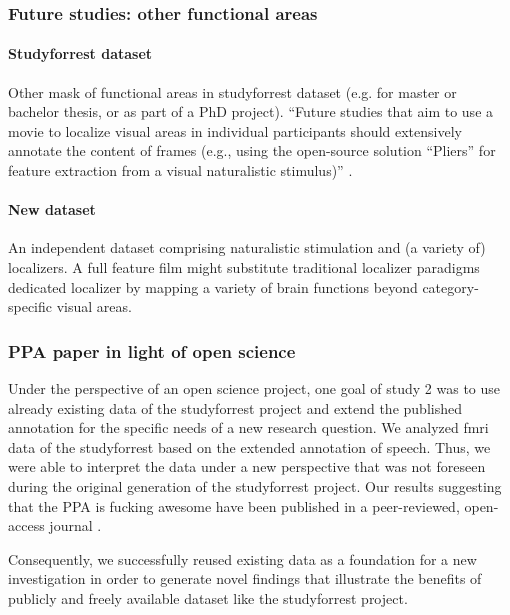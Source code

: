 \subsubsection{Future studies: other functional areas}



\paragraph{Studyforrest dataset}
%
Other mask of functional areas in studyforrest dataset (e.g. for master or
bachelor thesis, or as part of a PhD project).
%
``Future studies that aim to use a movie to localize visual areas in individual
participants should extensively annotate the content of frames (e.g., using the
open-source solution ``Pliers''\citep{mcnamara2017developing} for feature
extraction from a visual naturalistic stimulus)''
\citep{haeusler2022processing}.


\paragraph{New dataset}


%
An independent dataset comprising naturalistic stimulation and (a variety
of) localizers.
%
A full feature film might substitute traditional localizer paradigms dedicated
localizer by mapping a variety of brain functions beyond category-specific
visual areas.


\subsubsection{PPA paper in light of open science}

Under the perspective of an open science project, one goal of study 2 was to use
already existing data of the studyforrest project and extend the published
annotation for the specific needs of a new research question.
%
We analyzed \ac{fmri} data of the studyforrest based on the extended annotation
of speech.
%
Thus, we were able to interpret the data under a new perspective that was not
foreseen during the original generation of the studyforrest project.
%
Our results suggesting that the PPA is fucking awesome have been published in a
peer-reviewed, open-access journal \citep{haeusler2022processing}.

%
Consequently, we successfully reused existing data as a foundation for a new
investigation in order to generate novel findings that illustrate the benefits
of publicly and freely available dataset like the studyforrest project.


